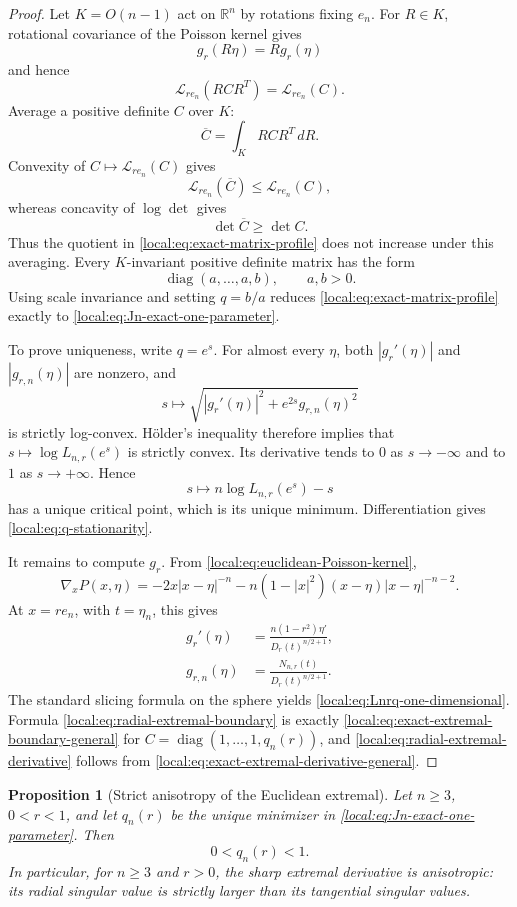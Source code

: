 \documentclass[11pt,reqno]{amsart}
\newtheorem{proposition}[theorem]{Proposition}
\theoremstyle{remark}
\newcommand{\R}{\mathbb R}
\begin{document}
\begin{proof}
Let $K=O(n-1)$ act on $\R^n$ by rotations fixing $e_n$.  For $R\in K$,
rotational covariance of the Poisson kernel gives
\[
 g_r(R\eta)=Rg_r(\eta)
\]
and hence
\[
 \mathcal L_{re_n}(RCR^T)=\mathcal L_{re_n}(C).
\]
Average a positive definite $C$ over $K$:
\[
 \overline C=\int_K RCR^T\,dR.
\]
Convexity of $C\mapsto\mathcal L_{re_n}(C)$ gives
\[
 \mathcal L_{re_n}(\overline C)
 \le
 \mathcal L_{re_n}(C),
\]
whereas concavity of $\log\det$ gives
\[
 \det\overline C\ge\det C.
\]
Thus the quotient in \eqref{local:eq:exact-matrix-profile} does not increase under
this averaging.  Every $K$-invariant positive definite matrix has the form
\[
 \operatorname{diag}(a,\ldots,a,b),
 \qquad a,b>0.
\]
Using scale invariance and setting $q=b/a$ reduces
\eqref{local:eq:exact-matrix-profile} exactly to
\eqref{local:eq:Jn-exact-one-parameter}.

To prove uniqueness, write $q=e^s$.  For almost every $\eta$, both
$|g_r'(\eta)|$ and $|g_{r,n}(\eta)|$ are nonzero, and
\[
 s\longmapsto
 \sqrt{|g_r'(\eta)|^2+e^{2s}g_{r,n}(\eta)^2}
\]
is strictly log-convex.  H\"older's inequality therefore implies that
$s\mapsto\log L_{n,r}(e^s)$ is strictly convex.  Its derivative tends to $0$
as $s\to-\infty$ and to $1$ as $s\to+\infty$.  Hence
\[
 s\longmapsto n\log L_{n,r}(e^s)-s
\]
has a unique critical point, which is its unique minimum.  Differentiation
gives \eqref{local:eq:q-stationarity}.

It remains to compute $g_r$.  From \eqref{local:eq:euclidean-Poisson-kernel},
\[
 \nabla_xP(x,\eta)
 =
 -2x|x-\eta|^{-n}
 -n(1-|x|^2)(x-\eta)|x-\eta|^{-n-2}.
\]
At $x=re_n$, with $t=\eta_n$, this gives
\begin{align*}
 g_r'(\eta)
 &=
 \frac{n(1-r^2)\eta'}{D_r(t)^{n/2+1}},\\
 g_{r,n}(\eta)
 &=
 \frac{N_{n,r}(t)}{D_r(t)^{n/2+1}}.
\end{align*}
The standard slicing formula on the sphere yields
\eqref{local:eq:Lnrq-one-dimensional}.  Formula
\eqref{local:eq:radial-extremal-boundary} is exactly
\eqref{local:eq:exact-extremal-boundary-general} for
$C=\operatorname{diag}(1,\ldots,1,q_n(r))$, and
\eqref{local:eq:radial-extremal-derivative} follows from
\eqref{local:eq:exact-extremal-derivative-general}.
\end{proof}


\begin{proposition}[Strict anisotropy of the Euclidean extremal]
\label{local:prop:q-less-than-one}
Let $n\ge3$, $0<r<1$, and let $q_n(r)$ be the unique minimizer in
\eqref{local:eq:Jn-exact-one-parameter}.
Then
\[
0<q_n(r)<1.
\]
In particular, for \(n\ge3\) and \(r>0\), the sharp extremal derivative is
anisotropic: its radial singular value is strictly larger than its
tangential singular values.
\end{proposition}
\end{document}
